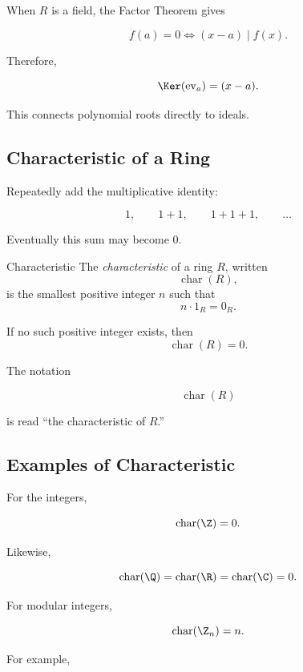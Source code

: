 When \(R\) is a field, the Factor Theorem gives

\[ f(a)=0\Longleftrightarrow (x-a)\mid f(x). \]

Therefore,

\[ \Ker(\operatorname{ev}_a)=(x-a). \]

This connects polynomial roots directly to ideals.

\subsection{Characteristic of a Ring}
\label{subsec:ring-characteristic}

Repeatedly add the multiplicative identity:

\[ 1,\qquad1+1,\qquad1+1+1,\qquad\ldots \]

Eventually this sum may become \(0\).

\begin{definitionbox}{Characteristic}
The \emph{characteristic} of a ring \(R\), written
\[ \operatorname{char}(R), \]
is the smallest positive integer \(n\) such that
\[ n\cdot1_R=0_R. \]

If no such positive integer exists, then
\[ \operatorname{char}(R)=0. \]
\end{definitionbox}

The notation

\[ \operatorname{char}(R) \]

is read ``the characteristic of \(R\).''

\subsection{Examples of Characteristic}
\label{subsec:ring-characteristic-examples}

For the integers,

\[ \operatorname{char}(\Z)=0. \]

Likewise,

\[ \operatorname{char}(\Q)=\operatorname{char}(\R)=\operatorname{char}(\C)=0. \]

For modular integers,

\[ \operatorname{char}(\Z_n)=n. \]

For example,

